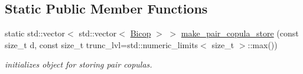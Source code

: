 \subsection*{Static Public Member Functions}
\begin{DoxyCompactItemize}
\item 
static std\+::vector$<$ std\+::vector$<$ \hyperlink{classvinecopulib_1_1_bicop}{Bicop} $>$ $>$ \hyperlink{classvinecopulib_1_1_vinecop_ac99ec5154d923ee5eb73fdad071bca46}{make\+\_\+pair\+\_\+copula\+\_\+store} (const size\+\_\+t d, const size\+\_\+t trunc\+\_\+lvl=std\+::numeric\+\_\+limits$<$ size\+\_\+t $>$\+::max())
\begin{DoxyCompactList}\small\item\em initializes object for storing pair copulas. \end{DoxyCompactList}\end{DoxyCompactItemize}
